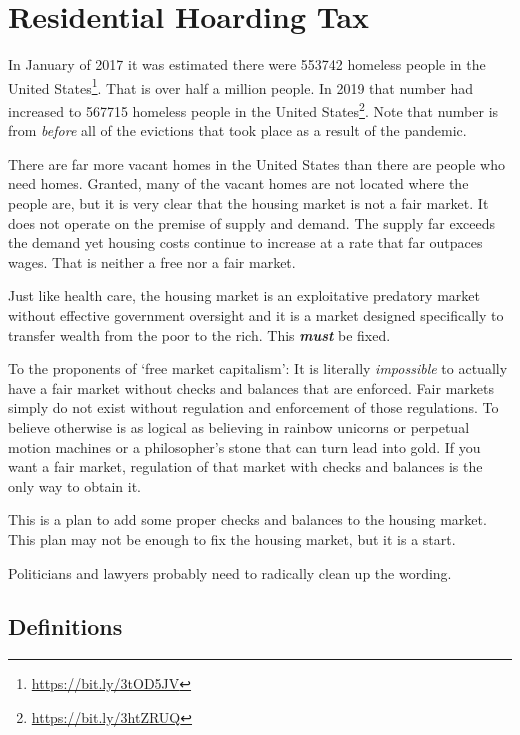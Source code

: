 \section{Residential Hoarding Tax}

In January of 2017 it was estimated there were \num[group-separator={,}]{553742} homeless people in the United States\footnote{\url{https://bit.ly/3tOD5JV}}. That is over half a million people. In 2019 that number had increased to \num[group-separator={,}]{567715} homeless people in the United States\footnote{\url{https://bit.ly/3htZRUQ}}. Note that number is from \emph{before} all of the evictions that took place as a result of the \covid{} pandemic.

There are far more vacant homes in the United States than there are people who need homes. Granted, many of the vacant homes are not located where the people are, but it is very clear that the housing market is not a fair market. It does not operate on the premise of supply and demand. The supply far exceeds the demand yet housing costs continue to increase at a rate that far outpaces wages. That is neither a free nor a fair market.

Just like health care, the housing market is an exploitative predatory market without effective government oversight and it is a market designed specifically to transfer wealth from the poor to the rich. This \textbf{\emph{must}} be fixed.

To the proponents of `free market capitalism': It is literally \emph{impossible} to actually have a fair market without checks and balances that are enforced. Fair markets simply do not exist without regulation and enforcement of those regulations. To believe otherwise is as logical as believing in rainbow unicorns or perpetual motion machines or a philosopher's stone that can turn lead into gold. If you want a fair market, regulation of that market with checks and balances is the only way to obtain it.

This is a plan to add some proper checks and balances to the housing market. This plan may not be enough to fix the housing market, but it is a start.

Politicians and lawyers probably need to radically clean up the wording.

\subsection{Definitions}

